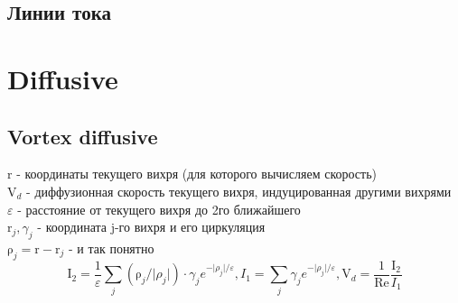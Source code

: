 \documentclass[a4paper,14pt]{extreport}
\newcommand{\br}[1]{\boldsymbol{\mathrm{#1}}}
\newcommand{\Reyn}{\text{Re}}
\begin{document}

\subsection{Линии тока}


\newpage
\section{Diffusive}
\subsection{Vortex diffusive}

$\br r$ - координаты текущего вихря (для которого вычисляем скорость) \\
$\br V_d$ - диффузионная скорость текущего вихря, индуцированная другими вихрями \\
$\varepsilon$ - расстояние от текущего вихря до 2го ближайшего \\
$\br r_j, \gamma_j$ - координата j-го вихря и его циркуляция \\
$\br\rho_j = \br r - \br r_j$ - и так понятно \\

\begin{equation*}
\br I_2 = \dfrac{1}{\varepsilon}
\sum\limits_j (\br\rho_j / \lvert\rho_j\rvert)\cdot\gamma_j e^{-\lvert\rho_j\rvert/\varepsilon},
I_1 = {\sum\limits_j \gamma_j e^{-\lvert\rho_j\rvert/\varepsilon}},
\br V_d = \dfrac{1}{\Reyn} \dfrac{\br I_2}{I_1}
\end{equation*}

\begin{center}\setlength\fboxsep{0pt}
\setlength\fboxrule{0.5pt}
\end{center}
\end{document}
